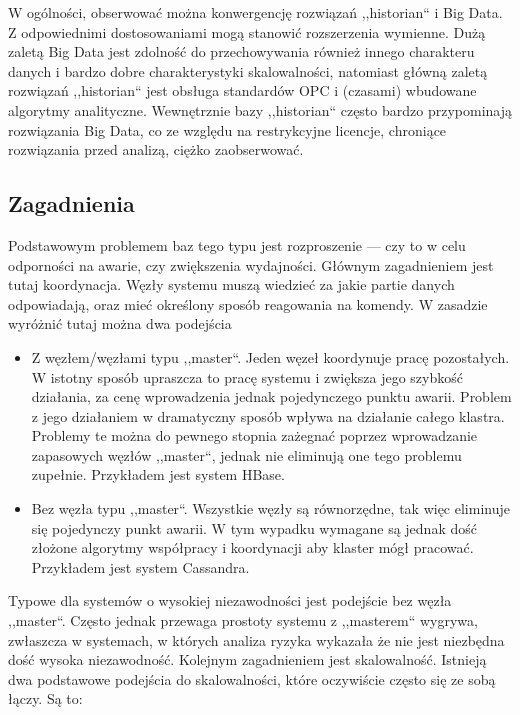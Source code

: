 \documentclass[a4paper,polish,12pt,twoside]{article}
\begin{document}
W ogólności, obserwować można konwergencję rozwiązań ,,historian`` i Big Data. Z odpowiednimi dostosowaniami mogą stanowić rozszerzenia wymienne. Dużą zaletą Big Data jest zdolność do przechowywania również innego charakteru danych i bardzo dobre charakterystyki skalowalności, natomiast główną zaletą rozwiązań ,,historian`` jest obsługa standardów OPC i (czasami) wbudowane algorytmy analityczne. Wewnętrznie bazy ,,historian`` często bardzo przypominają rozwiązania Big Data, co ze względu na restrykcyjne licencje, chroniące rozwiązania przed analizą, ciężko zaobserwować.

	\subsection{Zagadnienia}
Podstawowym problemem baz tego typu jest rozproszenie --- czy to w celu odporności na awarie, czy zwiększenia wydajności. Głównym zagadnieniem jest tutaj koordynacja. Węzły systemu muszą wiedzieć za jakie partie danych odpowiadają, oraz mieć określony sposób reagowania na komendy. W zasadzie wyróżnić tutaj można dwa podejścia
	\begin{itemize}
		\item Z węzłem/węzłami typu ,,master``. Jeden węzeł koordynuje pracę pozostałych. W istotny sposób upraszcza to pracę systemu i zwiększa jego szybkość działania, za cenę wprowadzenia jednak pojedynczego punktu awarii. Problem z jego działaniem w dramatyczny sposób wpływa na działanie całego klastra. Problemy te można do pewnego stopnia zażegnać poprzez wprowadzanie zapasowych węzłów ,,master``, jednak nie eliminują one tego problemu zupełnie. Przykładem jest system HBase.
		\item Bez węzła typu ,,master``. Wszystkie węzły są równorzędne, tak więc eliminuje się pojedynczy punkt awarii. W tym wypadku wymagane są jednak dość złożone algorytmy współpracy i koordynacji aby klaster mógł pracować. Przykładem jest system Cassandra.
	\end{itemize}

Typowe dla systemów o wysokiej niezawodności jest podejście bez węzła ,,master``. Często jednak przewaga prostoty systemu z ,,masterem`` wygrywa, zwłaszcza w systemach, w których analiza ryzyka wykazała że nie jest niezbędna dość wysoka niezawodność. Kolejnym zagadnieniem jest skalowalność. Istnieją dwa podstawowe podejścia do skalowalności, które oczywiście często się ze sobą łączy. Są to:
\end{document}
